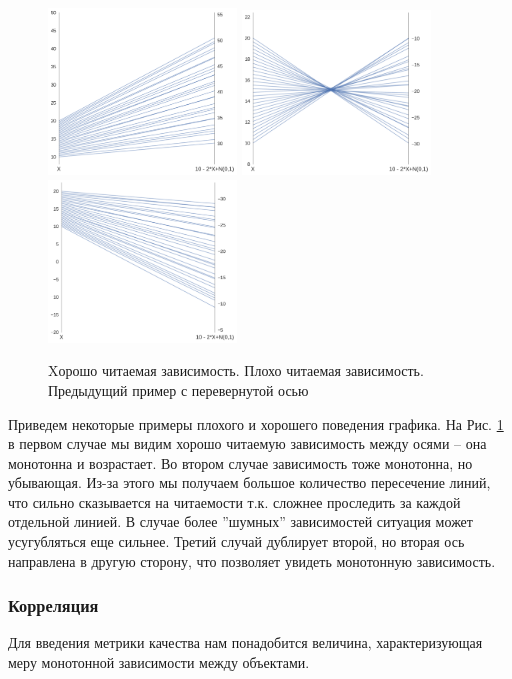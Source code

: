 \documentclass[12pt,fleqn]{article}
\begin{document}
\begin{figure}[htb]
    \centering
       \includegraphics[width=5cm]{monotone_good_example.pdf} \hfill
       \includegraphics[width=5cm]{monotone_bad_example.pdf} \hfill
       \includegraphics[width=5cm]{monotone_bad_with_direction.pdf} \hfill
   \caption{Xорошо читаемая зависимость. Плохо читаемая зависимость. Предыдущий пример с перевернутой осью}
   \label{monomote_example}
\end{figure}

Приведем некоторые примеры плохого и хорошего поведения графика. На Рис. \ref{monomote_example} в первом случае мы видим хорошо читаемую зависимость между осями -- она монотонна и возрастает.
Во втором случае зависимость тоже монотонна, но убывающая. Из-за этого мы получаем большое 
количество пересечение линий, что сильно сказывается на читаемости т.к. сложнее проследить за каждой отдельной линией. В случае более ''шумных'' зависимостей ситуация может усугубляться еще сильнее.
Третий случай дублирует второй, но вторая ось направлена в другую сторону, что позволяет увидеть монотонную зависимость.


\subsubsection*{Корреляция}
Для введения метрики качества нам понадобится величина, характеризующая меру монотонной зависимости
между объектами.
\end{document}
